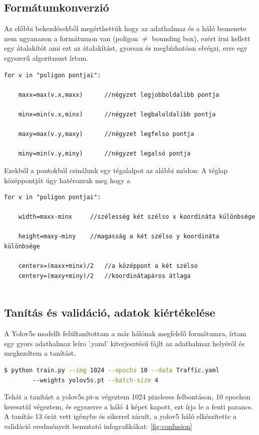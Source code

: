 \documentclass{article}
\begin{document}
\subsection{Formátumkonverzió}
Az előbbi bekezdésekből megérthettük hogy az adathalmaz és a háló bemenete nem ugyanazon a formátumon van (poligon $\neq$ bounding box),
ezért írni kellett egy átalakítót ami ezt az átalakítást, gyorsan és megbízhatóan elvégzi, erre egy egyszerű algoritmust írtam.
\newline
\begin{verbatim}
for v in "poligon pontjai": 

    maxx=max(v.x,maxx)      //négyzet legjobboldalibb pontja
    
    minx=min(v.x,minx)      //négyzet legbaloldalibb pontja
    
    maxy=max(v.y,maxy)      //négyzet legfelso pontja
    
    miny=min(v.y,miny)      //négyzet legalsó pontja
\end{verbatim}
Ezekből a pontokból csinálunk egy tégalalpot az alábbi módon:
A téglap középpontját úgy hatérozzuk meg hogy a 
\begin{verbatim}
for v in "poligon pontjai": 

    width=maxx-minx     //szélesség két szélso x koordináta különbsége
    
    height=maxy-miny    //magasság a két szélso y koordináta különbsége
    
    centerx=(maxx+minx)/2   //a középpont a két szélso 
    centery=(maxy+miny)/2   //koordinátapáros átlaga
    
\end{verbatim}

\subsection{Tanítás és validáció, adatok kiértékelése}
A Yolov5s modellt felültanítottam a már hálónak megfelelő formátumra, írtam egy gyors adathalmaz leíro '.yaml' kiterjesztésű fájlt az adathalmaz helyéről és megkezdtem a tanítást.

\begin{lstlisting}[language=bash]
$ python train.py --img 1024 --epochs 10 --data Traffic.yaml
        --weights yolov5s.pt --batch-size 4
\end{lstlisting}
Tehát a tanítást a yolov5s.pt-n végeztem 1024 pixeleses felbontáson, 10 epochon keresztül végeztem, és egyszerre a háló 4 képet kapott, ezt írja le a fenti parancs. 
A tanítás 13 órát vett igénybe és sikerrel zárult, a yolov5 háló elkészítette a validáció eredményeit bemutató infografikákat:
\autoref{fig:confusion}
\end{document}

